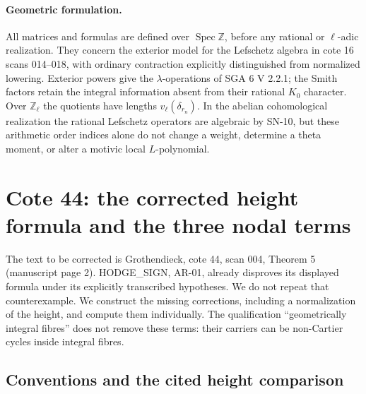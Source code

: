 \documentclass[11pt,a4paper]{article}
\theoremstyle{definition}
\theoremstyle{remark}
\begin{document}
\paragraph{Geometric formulation.}
All matrices and formulas are defined over
$\operatorname{Spec}\mathbb Z$, before any rational or
$\ell$-adic realization. They concern the exterior model for
the Lefschetz algebra in cote 16 scans 014--018, with ordinary
contraction explicitly distinguished from normalized lowering.
Exterior powers give the $\lambda$-operations of SGA 6 V 2.2.1;
the Smith factors retain the integral information absent from
their rational $K_0$ character. Over $\mathbb Z_\ell$ the
quotients have lengths $v_\ell(\delta_{r_n})$. In the abelian
cohomological realization the rational Lefschetz operators are
algebraic by SN-10, but these arithmetic order indices alone
do not change a weight, determine a theta moment, or alter a
motivic local $L$-polynomial.



\section{Cote 44: the corrected height formula and the three nodal terms}
\label{sec:singular-fibres}

The text to be corrected is Grothendieck, cote 44, scan 004, Theorem 5
(manuscript page 2).  HODGE\_SIGN, AR-01, already disproves its displayed
formula under its explicitly transcribed hypotheses.  We do not repeat
that counterexample.  We construct the missing corrections, including a
normalization of the height, and compute them individually.  The
qualification ``geometrically integral fibres'' does not remove these
terms: their carriers can be non-Cartier cycles inside integral fibres.

\subsection{Conventions and the cited height comparison}
\end{document}
